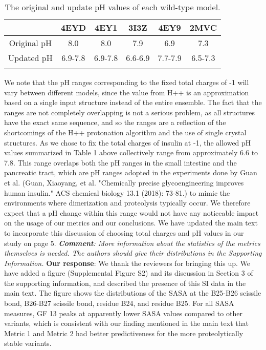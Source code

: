 \documentclass[sn-vancouver]{sn-jnl}
\begin{document}
\begin{table}[ht]
\caption{The original and update pH values of each wild-type model.}
\label{pH}
\centering
\begin{tabular}{@{}cccccc@{}}
\hline
            & 4EYD    & 4EY1    & 3I3Z    & 4EY9    & 2MVC    \\ \toprule
Original pH & 8.0     & 8.0     & 7.9     & 6.9     & 7.3     \\ %
Updated pH  & 6.9-7.8 & 6.9-7.8 & 6.6-6.9 & 7.7-7.9 & 6.5-7.3 \\ \botrule
\end{tabular}
\end{table}
We note that the pH ranges corresponding to the fixed total charges of -1 will vary between different models, since the value from H++ is an approximation based on a single input structure instead of the entire ensemble. The fact that the ranges are not completely overlapping is not a serious problem, as all structures have the exact same sequence, and so the ranges are a reflection of the shortcomings of the H++ protonation algorithm and the use of single crystal structures.  As we chose to fix the total charges of insulin at -1, the allowed pH values summarized in Table 1 above collectively range from approximately 6.6 to 7.8. This range overlaps both the pH ranges in the small intestine and the pancreatic tract, which are pH ranges adopted in the experiments done by Guan et al. (Guan, Xiaoyang, et al. "Chemically precise glycoengineering improves human insulin." ACS chemical biology 13.1 (2018): 73-81.) to mimic the environments where dimerization and proteolysis typically occur. We therefore expect that a pH change within this range would not have any noticeable impact on the usage of our metrics and our conclusions. We have updated the main text to incorporate this discussion of choosing total charges and pH values in our study on page 5.
\newline
\newline 
\indent
\textit{\textbf{Comment}:
More information about the statistics of the metrics themselves is needed. The authors should give their distributions in the Supporting Information.}
\newline
\indent 
{\bf Our response}: 
We thank the reviewers for bringing this up. We have added a figure (Supplemental Figure S2) and its discussion in Section 3 of the supporting information, and described the presence of this SI data in the main text. The figure shows the distributions of the SASA at the B25-B26 scissile bond, B26-B27 scissile bond, residue B24, and residue B25. For all SASA measures, GF 13 peaks at apparently lower SASA values compared to other variants, which is consistent with our finding mentioned in the main text that Metric 1 and Metric 2 had better predictiveness for the more proteolytically stable variants. 
\end{document}
